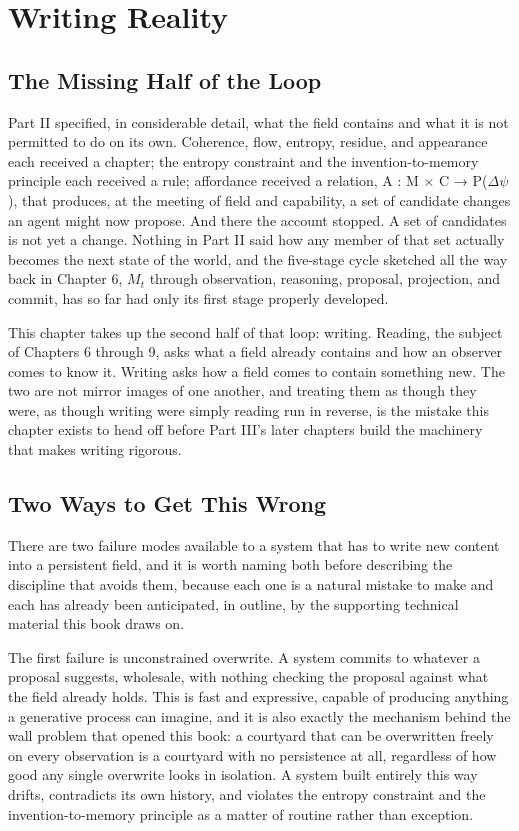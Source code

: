 \chapter{Writing Reality}

\section{The Missing Half of the Loop}

Part II specified, in considerable detail, what the field contains and what it is not permitted to do on its own. Coherence, flow, entropy, residue, and appearance each received a chapter; the entropy constraint and the invention-to-memory principle each received a rule; affordance received a relation, A : M × C → P(\(\Delta\psi\)), that produces, at the meeting of field and capability, a set of candidate changes an agent might now propose. And there the account stopped. A set of candidates is not yet a change. Nothing in Part II said how any member of that set actually becomes the next state of the world, and the five-stage cycle sketched all the way back in Chapter 6, \(M_t\) through observation, reasoning, proposal, projection, and commit, has so far had only its first stage properly developed.

This chapter takes up the second half of that loop: writing. Reading, the subject of Chapters 6 through 9, asks what a field already contains and how an observer comes to know it. Writing asks how a field comes to contain something new. The two are not mirror images of one another, and treating them as though they were, as though writing were simply reading run in reverse, is the mistake this chapter exists to head off before Part III's later chapters build the machinery that makes writing rigorous.

\section{Two Ways to Get This Wrong}

There are two failure modes available to a system that has to write new content into a persistent field, and it is worth naming both before describing the discipline that avoids them, because each one is a natural mistake to make and each has already been anticipated, in outline, by the supporting technical material this book draws on.

The first failure is unconstrained overwrite. A system commits to whatever a proposal suggests, wholesale, with nothing checking the proposal against what the field already holds. This is fast and expressive, capable of producing anything a generative process can imagine, and it is also exactly the mechanism behind the wall problem that opened this book: a courtyard that can be overwritten freely on every observation is a courtyard with no persistence at all, regardless of how good any single overwrite looks in isolation. A system built entirely this way drifts, contradicts its own history, and violates the entropy constraint and the invention-to-memory principle as a matter of routine rather than exception.

